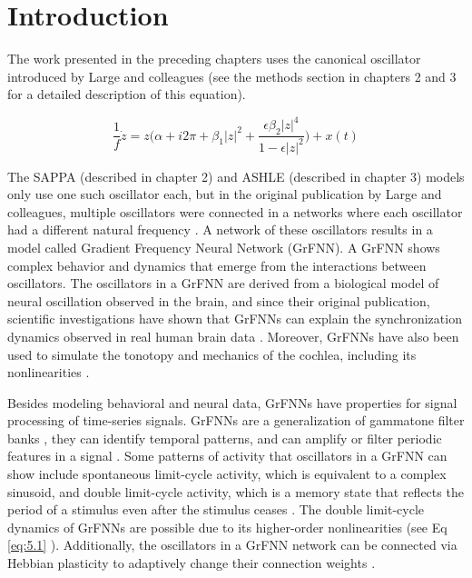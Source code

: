 \documentclass{report}
\begin{document}
\section{Introduction}

The work presented in the preceding chapters uses the canonical oscillator introduced by Large and colleagues \cite{large2010canonical} (see the methods section in chapters 2 and 3 for a detailed description of this equation).  

\begin{equation}
\frac{1}{f}\dot{z} = z\bigg(\alpha + i2\pi + \beta_1|z|^2 + \frac{\epsilon\beta_2|z|^4}{1-\epsilon|z|^2}\bigg) + x(t) \label{eq:5.1}
\end{equation}

The SAPPA (described in chapter 2) and ASHLE (described in chapter 3) models only use one such oscillator each, but in the original publication by Large and colleagues, multiple oscillators were connected in a networks where each oscillator had a different natural frequency \cite{large2010canonical}. A network of these oscillators results in a model called Gradient Frequency Neural Network (GrFNN). A GrFNN shows complex behavior and dynamics that emerge from the interactions between oscillators. The oscillators in a GrFNN are derived from a biological model of neural oscillation observed in the brain, and since their original publication, scientific investigations have shown that GrFNNs can explain the synchronization dynamics observed in real human brain data \cite{tal2017neural}. Moreover, GrFNNs have also been used to simulate the tonotopy and mechanics of the cochlea, including its nonlinearities \cite{lerud2019canonical}.

Besides modeling behavioral and neural data, GrFNNs have properties for signal processing of time-series signals\cite{kim2015signal}. GrFNNs are a generalization of gammatone filter banks \cite{large2015learning}, they can identify temporal patterns, and can amplify or filter periodic features in a signal \cite{kim2015signal}. Some patterns of activity that oscillators in a GrFNN can show include spontaneous limit-cycle activity, which is equivalent to a complex sinusoid, and double limit-cycle activity, which is a memory state that reflects the period of a stimulus even after the stimulus ceases \cite{kim2015signal}. The double limit-cycle dynamics of GrFNNs are possible due to its higher-order nonlinearities (see Eq \eqref{eq:5.1} \cite{large2010canonical, kim2015signal}). Additionally, the oscillators in a GrFNN network can be connected via Hebbian plasticity to adaptively change their connection weights \cite{lambert2016adaptive, kim2017dynamical}. 
\end{document}
